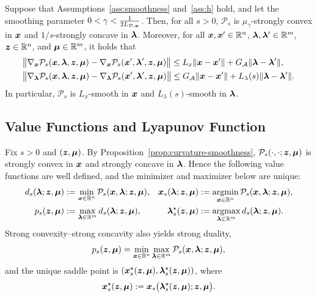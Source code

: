 \begin{proposition}
\label{prop:curvature-smoothness}
Suppose that Assumptions~\ref{ass:smoothness} and~\ref{ass:h} hold, and let the smoothing parameter  
$ 0 < \gamma < \frac{1}{2L_{\mathcal{D},\bm{x}}}$. Then, for all $s>0$, $\mathcal P_s$ is
$\mu_\gamma $-strongly convex in $\bm{x}$ and
$1/s$-strongly concave in $\bm{\lambda}$. Moreover, for all
$\bm{x},\bm{x}'\in\mathbb{R}^n$,
$\bm{\lambda},\bm{\lambda}'\in\mathbb{R}^m$,
$\bm{z}\in\mathbb{R}^n$, and
$\bm{\mu}\in\mathbb{R}^m$, it holds that 
\begin{align}
    &\bigl\|
    \nabla_{\bm{x}}\mathcal{P}_s(\bm{x},\bm{\lambda},\bm{z},\bm{\mu})
    -
    \nabla_{\bm{x}}\mathcal{P}_s(\bm{x}',\bm{\lambda}',\bm{z},\bm{\mu})
    \bigr\|
    \le
    L_x\|\bm{x}-\bm{x}'\|
    +
    G_{\mathcal{A}}\|\bm{\lambda}-\bm{\lambda}'\|,
    \label{eq:payoff-x-smoothness}
    \\
    &\bigl\|
    \nabla_{\bm{\lambda}}\mathcal{P}_s(\bm{x},\bm{\lambda},\bm{z},\bm{\mu})
    -
    \nabla_{\bm{\lambda}}\mathcal{P}_s(\bm{x}',\bm{\lambda}',\bm{z},\bm{\mu})
    \bigr\|
    \le
    G_{\mathcal{A}}\|\bm{x}-\bm{x}'\|
    +
    L_\lambda(s)\|\bm{\lambda}-\bm{\lambda}'\|
    \label{eq:payoff-lambda-smoothness}.
\end{align}
In particular, $\mathcal P_s$ is $L_x$-smooth in $\bm{x}$ and $L_\lambda(s)$-smooth in $\bm{\lambda}$.
\end{proposition}
 
\subsection{Value Functions and Lyapunov Function}
\label{subsec:value-functions}

Fix $s>0$ and $(\bm{z},\bm{\mu})$. By Proposition~\ref{prop:curvature-smoothness},
$\mathcal P_s(\cdot,\cdot;\bm{z},\bm{\mu})$ is strongly convex in $\bm{x}$ and strongly
concave in $\bm{\lambda}$. Hence the following value functions are well defined,
and the minimizer and maximizer below are unique:
\begin{align}
    d_s(\bm{\lambda};\bm{z},\bm{\mu})
    &:= \min_{\bm{x}\in\mathbb{R}^n}\mathcal P_s(\bm{x},\bm{\lambda};\bm{z},\bm{\mu}),
    &
    \bm{x}_s(\bm{\lambda};\bm{z},\bm{\mu})
    &:= \operatorname*{\mathrm{argmin}}_{\bm{x}\in\mathbb{R}^n}\mathcal P_s(\bm{x},\bm{\lambda};\bm{z},\bm{\mu}),
    \label{eq:dual-value}\\
    p_s(\bm{z},\bm{\mu})
    &:= \max_{\bm{\lambda}\in\mathbb{R}^m} d_s(\bm{\lambda};\bm{z},\bm{\mu}),
    &
    \bm{\lambda}_s^\star(\bm{z},\bm{\mu})
    &:= \operatorname*{\mathrm{argmax}}_{\bm{\lambda}\in\mathbb{R}^m} d_s(\bm{\lambda};\bm{z},\bm{\mu}).
    \label{eq:saddle-value}
\end{align}
Strong convexity--strong concavity also yields strong duality,
\begin{equation}
    p_s(\bm{z},\bm{\mu})
    = \min_{\bm{x}\in\mathbb{R}^n}\max_{\bm{\lambda}\in\mathbb{R}^m}
      \mathcal P_s(\bm{x},\bm{\lambda};\bm{z},\bm{\mu}),
    \label{eq:minimax-equality}
\end{equation}
and the unique saddle point is
$(\bm{x}_s^\star(\bm{z},\bm{\mu}),\bm{\lambda}_s^\star(\bm{z},\bm{\mu}))$, where
\[
    \bm{x}_s^\star(\bm{z},\bm{\mu})
    :=\bm{x}_s\bigl(\bm{\lambda}_s^\star(\bm{z},\bm{\mu});\bm{z},\bm{\mu}\bigr).
\]

